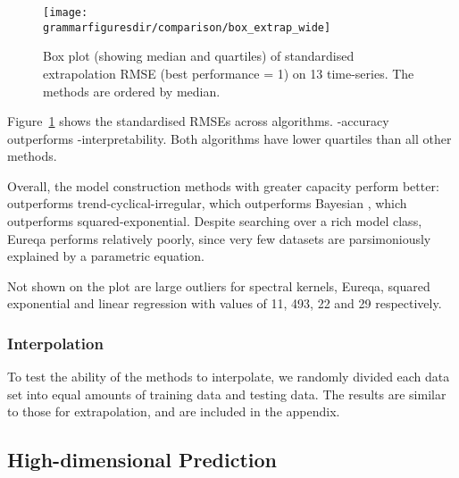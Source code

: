 \begin{figure}[h!]
\texttt{[image: \\grammarfiguresdir/comparison/box\_extrap\_wide]}
\caption[Comparision of extrapolation error of all methods on 13 time-series datasets.]
{Box plot (showing median and quartiles) of standardised extrapolation RMSE (best performance = 1) on 13 time-series.
The methods are ordered by median.
}
\label{fig:box_extrap_dist}
\end{figure}


Figure~\ref{fig:box_extrap_dist} shows the standardised RMSEs across algorithms.
\procedurename{}-accuracy outperforms \procedurename{}-interpretability.
Both algorithms have lower quartiles than all other methods.

Overall, the model construction methods with greater capacity perform better: \procedurename{} outperforms trend-cyclical-irregular, which outperforms Bayesian \MKL{}, which outperforms squared-exponential.
Despite searching over a rich model class, Eureqa performs relatively poorly, since very few datasets are parsimoniously explained by a parametric equation.

Not shown on the plot are large outliers for spectral kernels, Eureqa, squared exponential and linear regression with values of 11, 493, 22 and 29 respectively.

\subsubsection{Interpolation}
To test the ability of the methods to interpolate, we randomly divided each data set into equal amounts of training data and testing data.
The results are similar to those for extrapolation, and are included in the appendix.






\subsection{High-dimensional Prediction}

